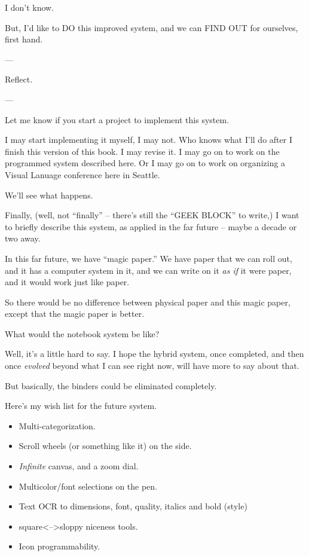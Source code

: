 \documentclass[oneside]{scrbook}
\begin{document}
I don't know.

But, I'd like to DO this improved system, and we can FIND OUT for
ourselves, first hand.

---

Reflect.

---

Let me know if you start a project to implement this system.

I may start implementing it myself, I may not. Who knows what I'll do
after I finish this version of this book. I may revise it. I may go on
to work on the programmed system described here. Or I may go on to
work on organizing a Visual Lanuage conference here in Seattle.

We'll see what happens.

Finally, (well, not ``finally'' -- there's still the ``GEEK BLOCK'' to
write,) I want to briefly describe this system, as applied in the far
future -- maybe a decade or two away.

In this far future, we have ``magic paper.'' We have paper that we can
roll out, and it has a computer system in it, and we can write on it
\emph{as if} it were paper, and it would work just like paper.

So there would be no difference between physical paper and this magic
paper, except that the magic paper is better.

What would the notebook system be like?

Well, it's a little hard to say. I hope the hybrid system, once
completed, and then once \emph{evolved} beyond what I can see right now,
will have more to say about that.

But basically, the binders could be eliminated completely.

Here's my wish list for the future system.

\begin{itemize}
\item Multi-categorization.
\item Scroll wheels (or something like it) on the side.
\item \emph{Infinite} canvas, and a zoom dial.
\item Multicolor/font selections on the pen.
\item Text OCR to dimensions, font, quality, italics and bold (style)
\item square<-->sloppy niceness tools.
\item Icon programmability.
\end{itemize}
\end{document}

